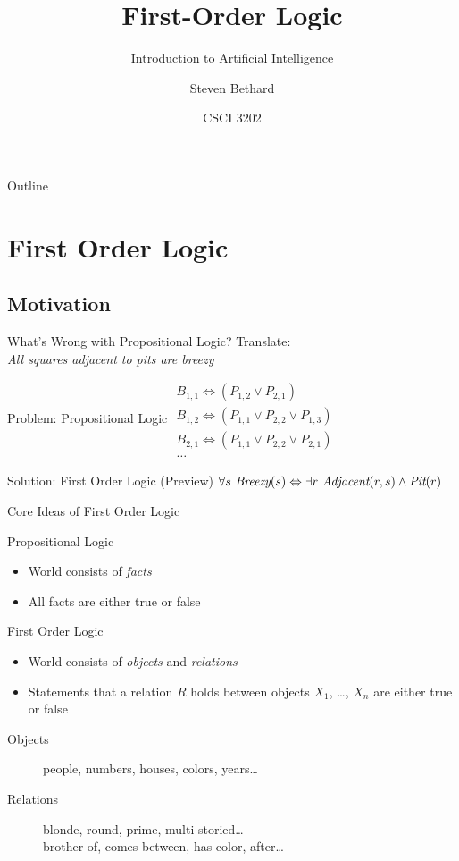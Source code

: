 \documentclass[12pt]{beamer}
\title{First-Order Logic}
\subtitle{Introduction to Artificial Intelligence}
\author{Steven Bethard}
\institute{
  Department of Computer Science\\
  University of Colorado
}
\date{CSCI 3202}
\newcommand{\EM}[1]{\mbox{\em#1}}
\newcommand{\tab}{\hspace{1em}}
\newcommand{\liff}{\Leftrightarrow}
\begin{document}
\begin{frame}
	\titlepage
\end{frame}
\begin{frame}{Outline}
	\footnotesize
	\tableofcontents
\end{frame}

\section{First Order Logic}
\subsection{Motivation}
\begin{frame}{What's Wrong with Propositional Logic?}
	Translate: \\
	\tab\emph{All squares adjacent to pits are breezy}
	\pause
	\begin{block}{Problem: Propositional Logic}
		$
		\begin{array}{l}
		B_{1,1} \liff (P_{1,2} \lor P_{2,1}) \\
		B_{1,2} \liff (P_{1,1} \lor P_{2,2} \lor P_{1,3}) \\
		B_{2,1} \liff (P_{1,1} \lor P_{2,2} \lor P_{2,1}) \\
		\ldots
		\end{array}
		$
	\end{block}
	\pause
	\begin{block}{Solution: First Order Logic (Preview)}
		$\forall s\ \EM{Breezy}(s) \liff \exists r\ \EM{Adjacent}(r, s) \land \EM{Pit}(r)$
	\end{block}
\end{frame}
\begin{frame}{Core Ideas of First Order Logic}
	\begin{block}{Propositional Logic}
		\begin{itemize}
			\item World consists of \emph{facts}
			\item All facts are either true or false
		\end{itemize}
	\end{block}
	\pause
	\begin{block}{First Order Logic}
		\begin{itemize}
			\item World consists of \emph{objects} and \emph{relations}
			\item Statements that a relation $R$ holds between objects $X_1$, \ldots, $X_n$ are either true or false
		\end{itemize}
		\pause
		\begin{description}
			\item[Objects] people, numbers, houses, colors, years\ldots
			\item[Relations]
				blonde, round, prime, multi-storied\ldots \\
			  brother-of, comes-between, has-color, after\ldots
		\end{description}
	\end{block}
\end{frame}
\end{document}
